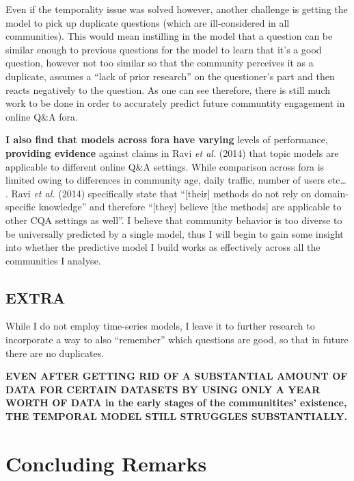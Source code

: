 \documentclass[11pt,preprint, authoryear]{article}
\numberwithin{equation}{section}
\begin{document}
Even if the temporality issue was solved however, another challenge is
getting the model to pick up duplicate questions (which are
ill-considered in all communities). This would mean instilling in the
model that a question can be similar enough to previous questions for
the model to learn that it's a good question, however not too similar so
that the community perceives it as a duplicate, assumes a ``lack of
prior research'' on the questioner's part and then reacts negatively to
the question. As one can see therefore, there is still much work to be
done in order to accurately predict future communtity engagement in
online Q\&A fora.

\textbf{I also find that models across fora have varying} levels of
performance, \textbf{providing evidence} against claims in Ravi \emph{et
al.} (2014) that topic models are applicable to different online Q\&A
settings. While comparison across fora is limited owing to differences
in community age, daily traffic, number of users etc\ldots{} . Ravi
\emph{et al.} (2014) specifically state that ``{[}their{]} methods do
not rely on domain-specific knowledge'' and therefore ``{[}they{]}
believe {[}the methods{]} are applicable to other CQA settings as
well''. I believe that community behavior is too diverse to be
universally predicted by a single model, thus I will begin to gain some
insight into whether the predictive model I build works as effectively
across all the communities I analyse.

\subsection{EXTRA}\label{extra-1}

While I do not employ time-series models, I leave it to further research
to incorporate a way to also ``remember'' which questions are good, so
that in future there are no duplicates.

\textbf{EVEN AFTER GETTING RID OF A SUBSTANTIAL AMOUNT OF DATA FOR
CERTAIN DATASETS BY USING ONLY A YEAR WORTH OF DATA in the early stages
of the communitites' existence, THE TEMPORAL MODEL STILL STRUGGLES
SUBSTANTIALLY.}

\newpage

\section{\texorpdfstring{Concluding Remarks
\label{Concl}}{Concluding Remarks }}\label{concluding-remarks}
\end{document}

